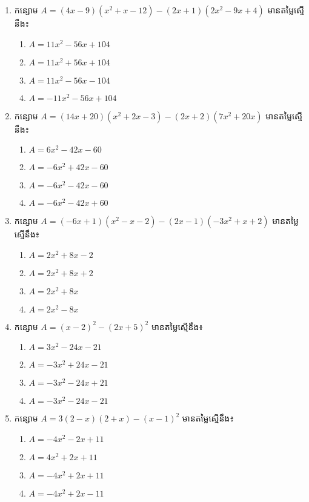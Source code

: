\begin{enumerate}
\item កន្សោម $A=(4x-9)(x^2+x-12)-(2x+1)(2x^2-9x+4)$ មានតម្លៃស្មើនឹង៖
\begin{multicols}{2}
\begin{enumerate}[label=\alph*.]
\item $A=11x^2-56x+104$
\item $A=11x^2+56x+104$
\item $A=11x^2-56x-104$
\item $A=-11x^2-56x+104$
\end{enumerate}
\end{multicols}

\item កន្សោម $A=(14x+20)(x^2+2x-3)-(2x+2)(7x^2+20x)$ មានតម្លៃស្មើនឹង៖
\begin{multicols}{2}
\begin{enumerate}[label=\alph*.]
\item $A=6x^2-42x-60$
\item $A=-6x^2+42x-60$
\item $A=-6x^2-42x-60$
\item $A=-6x^2-42x+60$
\end{enumerate}
\end{multicols}

\item កន្សោម $A=(-6x+1)(x^2-x-2)-(2x-1)(-3x^2+x+2)$ មានតម្លៃស្មើនឹង៖
\begin{multicols}{2}
\begin{enumerate}[label=\alph*.]
\item $A=2x^2+8x-2$
\item $A=2x^2+8x+2$
\item $A=2x^2+8x$
\item $A=2x^2-8x$
\end{enumerate}
\end{multicols}

\item កន្សោម $A=(x-2)^2-(2x+5)^2$ មានតម្លៃស្មើនឹង៖
\begin{multicols}{2}
\begin{enumerate}[label=\alph*.]
\item $A=3x^2-24x-21$
\item $A=-3x^2+24x-21$
\item $A=-3x^2-24x+21$
\item $A=-3x^2-24x-21$
\end{enumerate}
\end{multicols}

\item កន្សោម $A=3(2-x)(2+x)-(x-1)^2$ មានតម្លៃស្មើនឹង៖
\begin{multicols}{2}
\begin{enumerate}[label=\alph*.]
\item $A=-4x^2-2x+11$
\item $A=4x^2+2x+11$
\item $A=-4x^2+2x+11$
\item $A=-4x^2+2x-11$
\end{enumerate}
\end{multicols}


\end{enumerate}
